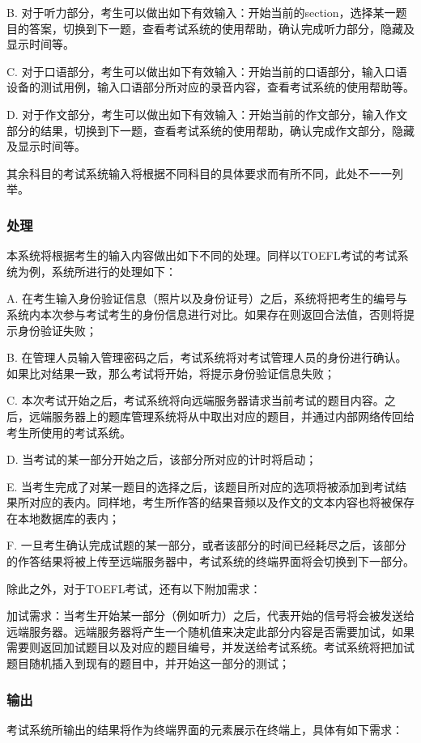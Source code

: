 B. 对于听力部分，考生可以做出如下有效输入：开始当前的section，选择某一题目的答案，切换到下一题，查看考试系统的使用帮助，确认完成听力部分，隐藏及显示时间等。

C. 对于口语部分，考生可以做出如下有效输入：开始当前的口语部分，输入口语设备的测试用例，输入口语部分所对应的录音内容，查看考试系统的使用帮助等。

D. 对于作文部分，考生可以做出如下有效输入：开始当前的作文部分，输入作文部分的结果，切换到下一题，查看考试系统的使用帮助，确认完成作文部分，隐藏及显示时间等。

其余科目的考试系统输入将根据不同科目的具体要求而有所不同，此处不一一列举。

\subsubsection{处理}
本系统将根据考生的输入内容做出如下不同的处理。同样以TOEFL考试的考试系统为例，系统所进行的处理如下：

A. 在考生输入身份验证信息（照片以及身份证号）之后，系统将把考生的编号与系统内本次参与考试考生的身份信息进行对比。如果存在则返回合法值，否则将提示身份验证失败；

B. 在管理人员输入管理密码之后，考试系统将对考试管理人员的身份进行确认。如果比对结果一致，那么考试将开始，将提示身份验证信息失败；

C. 本次考试开始之后，考试系统将向远端服务器请求当前考试的题目内容。之后，远端服务器上的题库管理系统将从中取出对应的题目，并通过内部网络传回给考生所使用的考试系统。

D. 当考试的某一部分开始之后，该部分所对应的计时将启动；

E. 当考生完成了对某一题目的选择之后，该题目所对应的选项将被添加到考试结果所对应的表内。同样地，考生所作答的结果音频以及作文的文本内容也将被保存在本地数据库的表内；

F. 一旦考生确认完成试题的某一部分，或者该部分的时间已经耗尽之后，该部分的作答结果将被上传至远端服务器中，考试系统的终端界面将会切换到下一部分。

除此之外，对于TOEFL考试，还有以下附加需求：

加试需求：当考生开始某一部分（例如听力）之后，代表开始的信号将会被发送给远端服务器。远端服务器将产生一个随机值来决定此部分内容是否需要加试，如果需要则返回加试题目以及对应的题目编号，并发送给考试系统。考试系统将把加试题目随机插入到现有的题目中，并开始这一部分的测试；

\subsubsection{输出}
考试系统所输出的结果将作为终端界面的元素展示在终端上，具体有如下需求：

